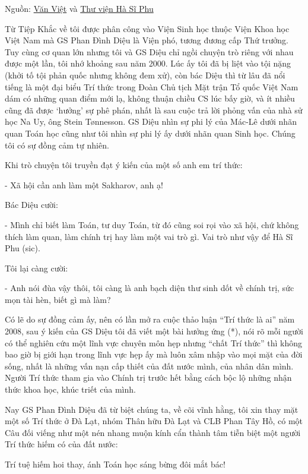 Nguồn: \href{http://vanviet.info/van-de-hom-nay/nho-mot-phan-dnh-dieu-cuong-truc/}{Văn Việt} và \href{http://www.hasiphu.com/baivietmoi_203.html}{Thư viện Hà Sĩ Phu} 

Từ Tiệp Khắc về tôi được phân công vào Viện Sinh học thuộc Viện Khoa học Việt Nam mà GS Phan Đình Diệu là Viện phó, tương đương cấp Thứ trưởng. Tuy cùng cơ quan lớn nhưng tôi và GS Diệu chỉ ngồi chuyện trò riêng với nhau được một lần, tôi nhớ khoảng sau năm 2000. Lúc ấy tôi đã bị liệt vào tội nặng (khởi tố tội phản quốc nhưng không đem xử), còn bác Diệu thì từ lâu đã nổi tiếng là một đại biểu Trí thức trong Đoàn Chủ tịch Mặt trận Tổ quốc Việt Nam dám có những quan điểm mới lạ, không thuận chiều CS lúc bấy giờ, và ít nhiều cũng đã được ‘hưởng’ sự phê phán, nhất là sau cuộc trả lời phỏng vấn của nhà sử học Na Uy, ông Stein Tønnesson. GS Diệu nhìn sự phi lý của Mác-Lê dưới nhãn quan Toán học cũng như tôi nhìn sự phi lý ấy dưới nhãn quan Sinh học. Chúng tôi có sự đồng cảm tự nhiên.

Khi trò chuyện tôi truyền đạt ý kiến của một số anh em trí thức:

- Xã hội cần anh làm một Sakharov, anh ạ!

Bác Diệu cười:

- Mình chỉ biết làm Toán, tư duy Toán, từ đó cũng soi rọi vào xã hội, chứ không thích làm quan, làm chính trị hay làm một vai trò gì. Vai trò như vậy để Hà Sĩ Phu (sic).

Tôi lại càng cười:

- Anh nói đùa vậy thôi, tôi càng là anh bạch diện thư sinh dốt về chính trị, sức mọn tài hèn, biết gì mà làm?

Có lẽ do sự đồng cảm ấy, nên có lần mở ra cuộc thảo luận “Trí thức là ai” năm 2008, sau ý kiến của GS Diệu tôi đã viết một bài hưởng ứng (*), nói rõ mỗi người có thể nghiên cứu một lĩnh vực chuyên môn hẹp nhưng “chất Trí thức” thì không bao giờ bị giới hạn trong lĩnh vực hẹp ấy mà luôn xâm nhập vào mọi mặt của đời sống, nhất là những vấn nạn cấp thiết của đất nước mình, của nhân dân mình. Người Trí thức tham gia vào Chính trị trước hết bằng cách bộc lộ những nhận thức khoa học, khúc triết của mình.

Nay GS Phan Đình Diệu đã từ biệt chúng ta, về cõi vĩnh hằng, tôi xin thay mặt một số Trí thức ở Đà Lạt, nhóm Thân hữu Đà Lạt và CLB Phan Tây Hồ, có một Câu đối viếng như một nén nhang muộn kính cẩn thành tâm tiễn biệt một người Trí thức hiếm có của đất nước:

Trí tuệ hiếm hoi thay, ánh Toán học sáng bừng đôi mắt bác!

